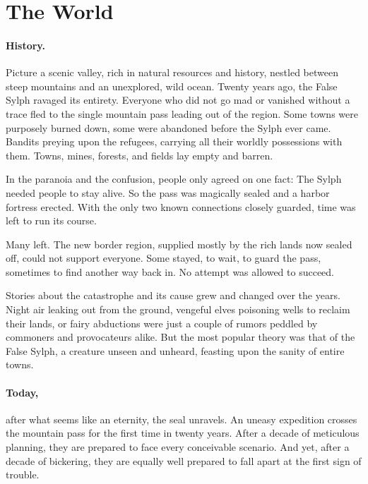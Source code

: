 \documentclass{zine}
\author{\textit{Written by Max Pernklau}}
\begin{document}
\maketitle





\section{The World}\label{_introduction}

\paragraph{History.}
Picture a scenic valley, rich in natural resources and history,
nestled between steep mountains and an unexplored, wild ocean.
Twenty years ago, the False Sylph ravaged its entirety. Everyone who
did not go mad or vanished without a trace fled to the single mountain
pass leading out of the region.
Some towns were purposely burned down, some
were abandoned before the Sylph ever came. Bandits preying upon the
refugees, carrying all their worldly possessions with them. Towns,
mines, forests, and fields lay empty and barren.

In the paranoia and the confusion, people only agreed on one fact: The
Sylph needed people to stay alive. So the pass was magically sealed and
a harbor fortress erected. With the only two known connections
closely guarded, time was left to run its course.

Many left. The new border region, supplied mostly by the rich lands now sealed off, could not support everyone. Some stayed, to wait, to guard the pass, sometimes to find another way back in. No attempt was allowed to succeed.

Stories about the catastrophe and its cause grew and changed over the
years. Night air leaking out from the ground, vengeful elves poisoning
wells to reclaim their lands, or fairy abductions were just a couple
of rumors peddled by commoners and provocateurs alike. But the most
popular theory was that of the False Sylph, a creature unseen
and unheard, feasting upon the sanity of entire towns.

\paragraph{Today,} after what seems like an eternity, the seal unravels.
An uneasy expedition crosses the mountain pass for the first time in twenty years.
After a decade of meticulous planning, they are prepared to face every
conceivable scenario. And yet, after a decade of bickering, they are
equally well prepared to fall apart at the first sign of trouble.
\end{document}
